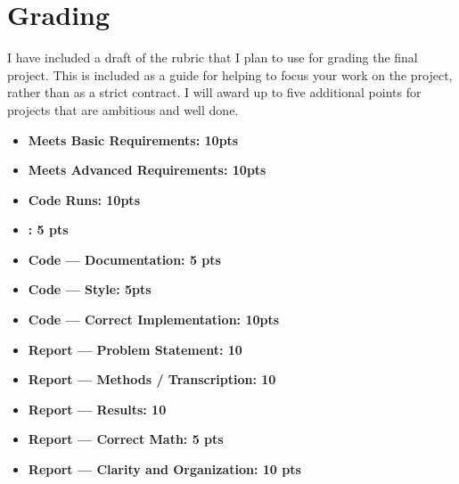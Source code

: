 
\section*{Grading}

I have included a draft of the rubric that I plan to use for grading the
final project. This is included as a guide for helping to focus your work on
the project, rather than as a strict contract.
I will award up to five additional points for projects that are ambitious and well done.

\vspace{-0.0em} \begin{itemize}  \setlength\itemsep{0em} \setlength\itemindent{4pt}

  \item \textbf{Meets Basic Requirements: 10pts}
  \item \textbf{Meets Advanced Requirements: 10pts}
  \item \textbf{Code Runs: 10pts}
  \item \textbf{: 5 pts}
  \item \textbf{Code --- Documentation: 5 pts}
  \item \textbf{Code --- Style: 5pts}
  \item \textbf{Code --- Correct Implementation: 10pts}
  \item \textbf{Report --- Problem Statement: 10}
  \item \textbf{Report --- Methods / Transcription: 10}
  \item \textbf{Report --- Results: 10}
  \item \textbf{Report --- Correct Math: 5 pts}
  \item \textbf{Report --- Clarity and Organization: 10 pts}


\end{itemize}


